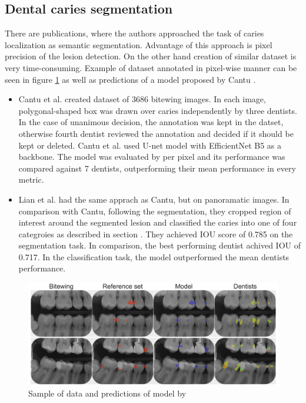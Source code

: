 \subsection{Dental caries segmentation}
There are publications, where the authors approached the task of caries localization as semantic segmentation. Advantage of this approach is pixel precision of the lesion detection. On the other hand creation of similar dataset is very time-consuming. Example of dataset annotated in pixel-wise manner can be seen in figure \ref{fig:segmentation_lit} as well as predictions of a model proposed by Cantu \cite{Cantu2020}.
\begin{itemize}
    \item{Cantu et al. \cite{Cantu2020}} created dataset of 3686 bitewing images. In each image, polygonal-shaped box was drawn over caries independently by three dentists. In the case of unanimous decision, the annotation was kept in the datset, otherwise fourth dentist reviewed the annotation and decided if it should be kept or deleted. Cantu et al. used U-net model with EfficientNet B5 as a backbone. The model was evaluated by per pixel and its performance was compared against 7 dentists, outperforming their mean performance in every metric.
    \item{Lian et al. \cite{Lian2021}} had the same apprach as Cantu, but on panoramatic images. In comparison with Cantu, following the segmentation, they cropped region of interest around the segmented lesion and classified the caries into one of four categroies as described in section . They achieved IOU score of 0.785 on the segmentation task. In comparison, the best performing dentist achived IOU of 0.717. In the classification task, the model outperformed the mean dentists performance.
\end{itemize}

\begin{figure}
    \centering
    \includegraphics[width=\linewidth]{images/segmentatic_literature.png}
    \caption{Sample of data and predictions of model by }
    \label{fig:segmentation_lit}
\end{figure}

